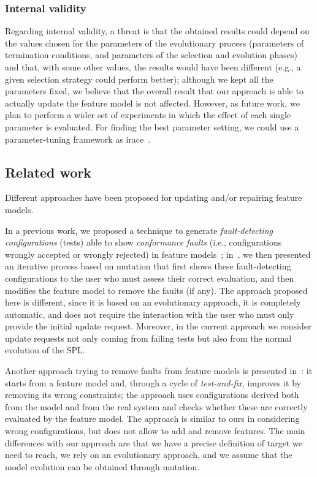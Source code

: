 \begin{tikzborder}{\cite{Gargantini16:validation}}
\begin{tikzborder}{\cite{gargantini_combinatorial_2017}}
\begin{tikzborder}{\cite{garn2019}}
\begin{tikzborder}{\cite{arcaini2019achieving}}
	\subsubsection{Internal validity}\label{sec:internalValidity}
	\bb Regarding internal validity, a threat is that the obtained results could depend on the values chosen for the parameters of the evolutionary process (parameters of termination conditions, and parameters of the selection and evolution phases) and that, with some other values, the results would have been different (e.g., a given selection strategy could perform better); although we kept all the parameters fixed, we believe that the overall result that our approach is able to actually update the feature model is not affected. However, as future work, we plan to perform a wider set of experiments in which the effect of each single parameter is evaluated. For finding the best parameter setting, we could use a parameter-tuning framework as irace~\cite{irace}.\be
	
	\subsection{Related work}\label{sec:fmrelatedwork1}
	\bb
	Different approaches have been proposed for updating and/or repairing feature models.
	
	In a previous work, we proposed a technique to generate \emph{fault-detecting configurations} (tests) able to show \emph{conformance faults} (i.e., configurations wrongly accepted or wrongly rejected) in feature models~\cite{icst2015}; in~\cite{icst2016}, we then presented an iterative process based on mutation that first shows these fault-detecting configurations to the user who must assess their correct evaluation, and then modifies the feature model to remove the faults (if any). The approach proposed here is different, since it is based on an evolutionary approach, it is completely automatic, and does not require the interaction with the user who must only provide the initial update request. Moreover, in the current approach we consider update requests not only coming from failing tests but also from the normal evolution of the SPL.
	
	Another approach trying to remove faults from feature models is presented in~\cite{henard_towards_2013}: it starts from a feature model and, through a cycle of \emph{test-and-fix}, improves it by removing its wrong constraints; the approach uses configurations derived both from the model and from the real system and checks whether these are correctly evaluated by the feature model. The approach is similar to ours in considering wrong configurations, but does not allow to add and remove features. The main differences with our approach are that we have a precise definition of target we need to reach, we rely on an evolutionary approach, and we assume that the model evolution can be obtained through mutation.
	

\end{tikzborder}
\end{tikzborder}
\end{tikzborder}
\end{tikzborder}

